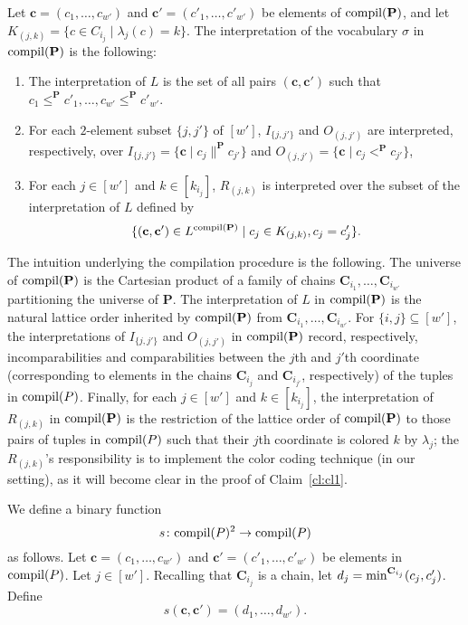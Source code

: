 \documentclass[usletter]{article}
\newcommand{\longversion}[1]{#1}
\newcommand{\shortversion}[1]{}
\newcommand{\longshort}[2]{\longversion{#1}\shortversion{#2}}
\newcommand{\cc}{\mathbf{C}}
\newcommand{\pp}{\mathbf{P}}
\newcommand{\suchthat}{\;\ifnum\currentgrouptype=16 \middle\fi|\;}
\begin{document}
Let $\mathbf{c}=(c_1,\ldots,c_{w'})$ and $\mathbf{c}'=(c'_1,\ldots,c'_{w'})$ 
be elements of $\textup{compil}(\mathbf{P})$, and let $K_{(j,k)}=\{ c \in C_{i_j} \mid \lambda_j(c)=k \}$.  
The interpretation of the vocabulary $\sigma$ 
in $\textup{compil}(\mathbf{P})$ is the following:
\begin{enumerate}[label=\textit{(\roman*)}] 
\item The interpretation of $L$ is the set of all pairs $(\mathbf{c},\mathbf{c}')$ 
such that $c_1 \leq^\mathbf{P} c'_1,\ldots,c_{w'} \leq^\mathbf{P} c'_{w'}$.
\item For each $2$-element subset $\{j,j'\}$ of $[w']$, 
$I_{\{j,j'\}}$ and $O_{(j,j')}$ are interpreted, respectively, over  
$I_{\{j,j'\}}=\{ \mathbf{c} \mid c_{j} \parallel^\mathbf{P} c_{j'} \}$  
and $O_{(j,j')}=\{ \mathbf{c} \mid c_{j} <^\mathbf{P} c_{j'} \}$,
\item For each $j \in [w']$ and $k \in [k_{i_j}]$, 
$R_{(j,k)}$ is interpreted over the subset of the interpretation of $L$ defined by 
$$\{ (\mathbf{c},\mathbf{c}') \in L^{\textup{compil}(\mathbf{P})} \suchthat 
\text{$c_{j}\in K_{(j,k)},c_{j}=c'_{j}$} \} 
\text{.}$$
\end{enumerate}


\longshort{\excompilp}{\excompilp}

The intuition underlying the compilation procedure is the following.  
The universe of $\textup{compil}(\pp)$ is the Cartesian product 
of a family of chains $\cc_{i_1},\ldots,\cc_{i_{w'}}$ partitioning the universe of $\pp$.  
The interpretation of $L$ in $\textup{compil}(\pp)$ is the natural lattice order inherited 
by $\textup{compil}(\pp)$ from $\cc_{i_1},\ldots,\cc_{i_{w'}}$.  For 
$\{i,j\} \subseteq [w']$, the interpretations of 
$I_{\{j,j'\}}$ and $O_{(j,j')}$ in $\textup{compil}(\pp)$ 
record, respectively, incomparabilities and comparabilities between the $j$th and $j'$th 
coordinate (corresponding to elements in the chains $\cc_{i_j}$ and $\cc_{i_{j'}}$, respectively) 
of the tuples in $\textup{compil}(P)$.  Finally, 
for each $j \in [w']$ and $k \in [k_{i_j}]$, 
the interpretation of $R_{(j,k)}$ in $\textup{compil}(\pp)$ 
is the restriction of the lattice order of $\textup{compil}(\pp)$ 
to those pairs of tuples in $\textup{compil}(P)$ such that their 
$j$th coordinate is colored $k$ by $\lambda_j$; the $R_{(j,k)}$'s 
responsibility is to implement the color coding technique (in our setting), 
as it will become clear in the proof of Claim~\ref{cl:cl1}.  

We define a binary function $$s \colon \textup{compil}(P)^2 \to \textup{compil}(P)$$ 
as follows.  Let $\mathbf{c}=(c_1,\ldots,c_{w'})$ and $\mathbf{c}'=(c'_1,\ldots,c'_{w'})$ 
be elements in $\textup{compil}(P)$.  Let $j \in [w']$.  
Recalling that $\cc_{i_j}$ is a chain, 
let $d_j=\textup{min}^{\cc_{i_j}}(c_j,c'_j)$.  Define 
\begin{equation}\label{eq:semilattice}
s(\mathbf{c},\mathbf{c}')=(d_1,\ldots,d_{w'})\text{.} 
\end{equation}
\end{document}
